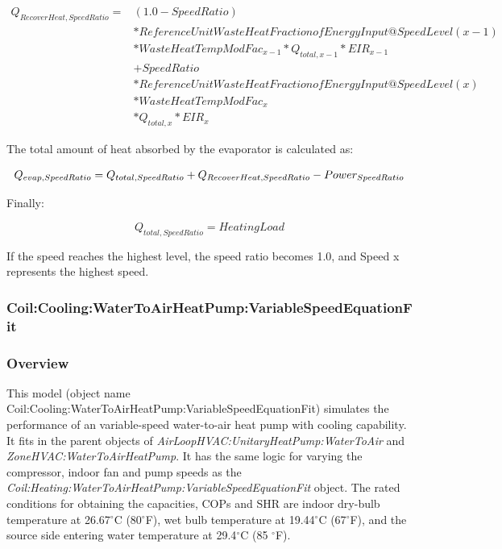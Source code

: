 \begin{equation}
  \begin{array}{rl}
    Q_{RecoverHeat,SpeedRatio} =& \left( 1.0 - SpeedRatio \right) \\
                               &* ReferenceUnitWasteHeatFractionofEnergyInput@SpeedLevel\left( {x - 1} \right) \\
                               &* WasteHeatTempModFac_{x - 1} * Q_{total,x - 1} * EIR_{x - 1} \\
                               &+ SpeedRatio \\
                               &* ReferenceUnitWasteHeatFractionofEnergyInput@SpeedLevel\left( x \right) \\
                               &* WasteHeatTempModFac_x \\
                               &* Q_{total,x} * EIR_x
  \end{array}
\end{equation}

The total amount of heat absorbed by the evaporator is calculated as:

\begin{equation}
{Q_{evap,SpeedRatio}} = {Q_{total,SpeedRatio}} + {\rm{}}{Q_{RecoverHeat,SpeedRatio}} - Powe{r_{SpeedRatio}}
\end{equation}

Finally:

\begin{equation}
{Q_{total,SpeedRatio}} = HeatingLoad
\end{equation}

If the speed reaches the highest level, the speed ratio becomes 1.0, and Speed x represents the highest speed.

\subsubsection{Coil:Cooling:WaterToAirHeatPump:VariableSpeedEquationFit}\label{coilcoolingwatertoairheatpumpvariablespeedequationfit}

\subsubsection{Overview}\label{overview-14}

This model (object name Coil:Cooling:WaterToAirHeatPump:VariableSpeedEquationFit) simulates the performance of an variable-speed water-to-air heat pump with cooling capability. It fits in the parent objects of \emph{AirLoopHVAC:UnitaryHeatPump:WaterToAir} and \emph{ZoneHVAC:WaterToAirHeatPump}. It has the same logic for varying the compressor, indoor fan and pump speeds as the \emph{Coil:Heating:WaterToAirHeatPump:VariableSpeedEquationFit} object. The rated conditions for obtaining the capacities, COPs and SHR are indoor dry-bulb temperature at 26.67\(^{\circ}\)C (80\(^{\circ}\)F), wet bulb temperature at 19.44\(^{\circ}\)C (67\(^{\circ}\)F), and the source side entering water temperature at 29.4\(^{\circ}\)C (85 \(^{\circ}\)F).

